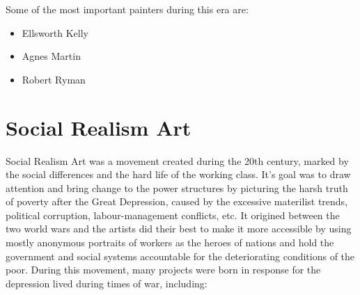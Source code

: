 \documentclass{report}
\begin{document}
Some of the most important painters during this era are:
\begin{itemize}
	\item{Ellsworth Kelly}
	\item{Agnes Martin}
	\item{Robert Ryman}
\end{itemize}
		
\section{Social Realism Art}

Social Realism Art was a movement created during the 20th century, marked by the social differences and the hard life of the working class. It's goal was to draw attention and bring change to the power structures by picturing the harsh truth of poverty after the Great Depression, caused by the excessive materilist trends, political corruption, labour-management conflicts, etc.	It origined between the two world wars and the artists did their best to make it more accessible by using mostly anonymous portraits of workers as the heroes of nations and hold the government and social systems accountable for the deteriorating conditions of the poor. During this movement, many projects were born in response for the depression lived during times of war, including:
\end{document}
